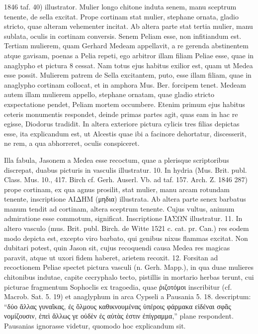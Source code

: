 \documentclass[landscape, a4paper, 11pt, oneside, polutonikogreek, german]{article}
\begin{document}
1846 taf. 40) illustrator. Mulier longo chitone induta senem, manu sceptrum tenente, de sella excitat. Prope cortinam stat mulier, stephane ornata, gladio stricto, quae alteram vehementer incitat. Ab altera parte stat tertia mulier, manu sublata, oculis in cortinam conversis. Senem Peliam esse, non infitiandum est. Tertiam mulierem, quam Gerhard Medeam appellavit, a re gerenda abstinentem atque gavisam, poenas a Pelia repeti, ego arbitror illam filiam Peliae esse, quae in anaglypho et pictura 8 cessat. Nam totus ejus habitus exilior est, quam ut Medea esse possit. Mulierem patrem de Sella excitantem, puto, esse illam filiam, quae in anaglypho cortinam collocat, et in amphora Mus. Ber. forcipem tenet. Medeam autem illam mulierem appello, stephane ornatam, quae gladio stricto exspectatione pendet, Peliam mortem occumbere. Etenim primum ejus habitus ceteris monumentis respondet, deinde primas partes agit, quas eam in hac re egisse, Diodorus tradidit. In altera exteriore pictura cylicis tres filias depictas esse, ita explicandum est, ut Alcestis quae ibi a facinore dehortatur, discesserit, ne rem, a qua abhorreret, oculis conspiceret.

Illa fabula, Jasonem a Medea esse recoctum, quae a plerisque scriptoribus discrepat, duabus picturis in vasculis illustratur. 10. In hydria (Mus. Brit. publ. Class. Mus. 10., 417. Birch cf. Gerh. Auserl. Vb. ad taf. 157. Arch. Z. 1846 287) prope cortinam, ex qua agnus prosilit, stat mulier, manu arcam rotundam tenente, inscriptione ΑΙΔΗΜ (μηδια) illustrata. Ab altera parte senex barbatus manum tendit ad cortinam, altera sceptrum tenente. Cujus vultus, animum admiratione esse commotum, significat. Inscriptione ΙΑΣΩΝ illustratur. 11. In altero vasculo (mus. Brit. publ. Birch. de Witte 1521 c. cat. pr. Can.) res eodem modo depicta est, excepto viro barbato, qui genibus nixus flammas excitat. Non dubitari potest, quin Jason sit, cujus recoquendi causa Medea res magicas paravit, atque ut uxori fidem haberet, arietem recoxit. 12. Forsitan ad recoctionem Peliae spectet pictura vasculi (n. Gerh. Mapp.), in qua duae mulieres chitonibus indutae, capite cecryphalo tecto, pistillis in mortario herbas terunt, cui picturae fragmentum Sophoclis ex tragoedia, quae ῥιζοτόμοι inscribitur (cf. Macrob. Sat. 5. 19) et anaglyphum in arca Cypseli a Pausania 5. 18. descriptum: "`δύο ἄλλας γυναῖκας, ἐς ὅλμους καθικνουμένας ὑπέροις φάρμακα εἰδέναι σφᾶς νομίζουσιν, ἐπεὶ ἄλλως γε οὐδὲν ἐς αὐτὰς ἐστιν ἐπίγραμμα,"' plane respondent. Pausanias ignorasse videtur, quomodo hoc explicandum sit.
\end{document}
